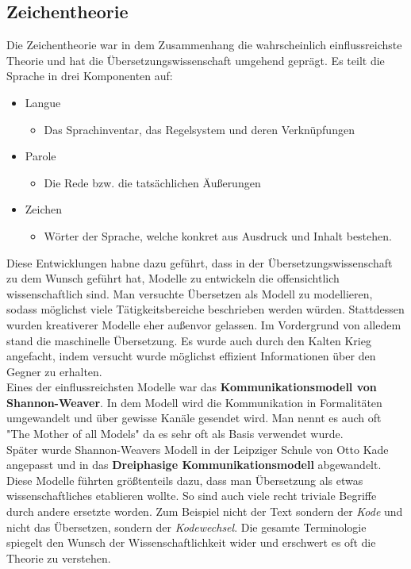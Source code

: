 \documentclass{article}
\begin{document}
	\subsection{Zeichentheorie}
	Die Zeichentheorie war in dem Zusammenhang die wahrscheinlich einflussreichste Theorie und hat die Übersetzungswissenschaft umgehend geprägt. Es teilt die Sprache in drei Komponenten auf:
	\begin{itemize}
		\item{Langue}
		\begin{itemize}
			\item{Das Sprachinventar, das Regelsystem und deren Verknüpfungen}
		\end{itemize}
		\item{Parole}
		\begin{itemize}
			\item{Die Rede bzw. die tatsächlichen Äußerungen}
		\end{itemize}
		\item{Zeichen}
		\begin{itemize}
			\item{Wörter der Sprache, welche konkret aus Ausdruck und Inhalt bestehen.}
		\end{itemize}
	\end{itemize}

	Diese Entwicklungen habne dazu geführt, dass in der Übersetzungswissenschaft zu dem Wunsch geführt hat, Modelle zu entwickeln die offensichtlich wissenschaftlich sind. Man versuchte Übersetzen als Modell zu modellieren, sodass möglichst viele Tätigkeitsbereiche beschrieben werden würden. Stattdessen wurden kreativerer Modelle eher außenvor gelassen. Im Vordergrund von alledem stand die maschinelle Übersetzung. Es wurde auch durch den Kalten Krieg angefacht, indem versucht wurde möglichst effizient Informationen über den Gegner zu erhalten. \\
	Eines der einflussreichsten Modelle war das \textbf{Kommunikationsmodell von Shannon-Weaver}. In dem Modell wird die Kommunikation in Formalitäten umgewandelt und über gewisse Kanäle gesendet wird. Man nennt es auch oft "The Mother of all Models" da es sehr oft als Basis verwendet wurde. \\
	Später wurde Shannon-Weavers Modell in der Leipziger Schule von Otto Kade angepasst und in das \textbf{Dreiphasige Kommunikationsmodell} abgewandelt. Diese Modelle führten größtenteils dazu, dass man Übersetzung als etwas wissenschaftliches etablieren wollte. So sind auch viele recht triviale Begriffe durch andere ersetzte worden. Zum Beispiel nicht der Text sondern der \textit{Kode} und nicht das Übersetzen, sondern der \textit{Kodewechsel}. Die gesamte Terminologie spiegelt den Wunsch der Wissenschaftlichkeit wider und erschwert es oft die Theorie zu verstehen. \\
\end{document}
